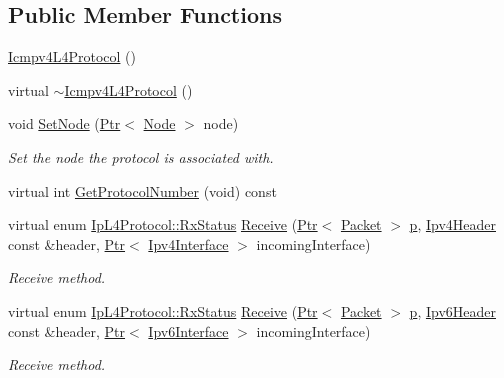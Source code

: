 \subsection*{Public Member Functions}
\begin{DoxyCompactItemize}
\item 
\hyperlink{classns3_1_1Icmpv4L4Protocol_aeb67dfc233f6df97c4cd992ae48ad941}{Icmpv4\+L4\+Protocol} ()
\item 
virtual \hyperlink{classns3_1_1Icmpv4L4Protocol_a0c7da08904b0fe598fa6893cbac5a9c4}{$\sim$\+Icmpv4\+L4\+Protocol} ()
\item 
void \hyperlink{classns3_1_1Icmpv4L4Protocol_a81a911ddfcb927efadf6174044ca94d9}{Set\+Node} (\hyperlink{classns3_1_1Ptr}{Ptr}$<$ \hyperlink{classns3_1_1Node}{Node} $>$ node)
\begin{DoxyCompactList}\small\item\em Set the node the protocol is associated with. \end{DoxyCompactList}\item 
virtual int \hyperlink{classns3_1_1Icmpv4L4Protocol_a17396ec8cbb46d31e352b9a68a0cd818}{Get\+Protocol\+Number} (void) const 
\item 
virtual enum \hyperlink{classns3_1_1IpL4Protocol_afd3744c89902fff232e2fd45f558c80e}{Ip\+L4\+Protocol\+::\+Rx\+Status} \hyperlink{classns3_1_1Icmpv4L4Protocol_a2e7b29d1437b29d8d8afab9b77bb5758}{Receive} (\hyperlink{classns3_1_1Ptr}{Ptr}$<$ \hyperlink{classns3_1_1Packet}{Packet} $>$ \hyperlink{lte__link__budget__x2__handover__measures_8m_ac9de518908a968428863f829398a4e62}{p}, \hyperlink{classns3_1_1Ipv4Header}{Ipv4\+Header} const \&header, \hyperlink{classns3_1_1Ptr}{Ptr}$<$ \hyperlink{classns3_1_1Ipv4Interface}{Ipv4\+Interface} $>$ incoming\+Interface)
\begin{DoxyCompactList}\small\item\em Receive method. \end{DoxyCompactList}\item 
virtual enum \hyperlink{classns3_1_1IpL4Protocol_afd3744c89902fff232e2fd45f558c80e}{Ip\+L4\+Protocol\+::\+Rx\+Status} \hyperlink{classns3_1_1Icmpv4L4Protocol_a9d00bee7284f6b9925d9d0a942365784}{Receive} (\hyperlink{classns3_1_1Ptr}{Ptr}$<$ \hyperlink{classns3_1_1Packet}{Packet} $>$ \hyperlink{lte__link__budget__x2__handover__measures_8m_ac9de518908a968428863f829398a4e62}{p}, \hyperlink{classns3_1_1Ipv6Header}{Ipv6\+Header} const \&header, \hyperlink{classns3_1_1Ptr}{Ptr}$<$ \hyperlink{classns3_1_1Ipv6Interface}{Ipv6\+Interface} $>$ incoming\+Interface)
\begin{DoxyCompactList}\small\item\em Receive method. \end{DoxyCompactList}\item 

\end{DoxyCompactItemize}
